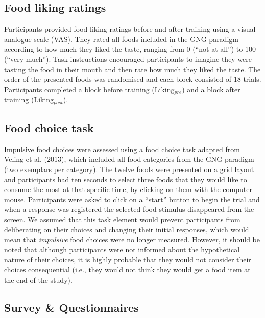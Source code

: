\documentclass[man,floatsintext]{apa6}
\begin{document}
\subsection{Food liking ratings}\label{food_ratings}

\par

Participants provided food liking ratings before and after training
using a visual analogue scale (VAS). They rated all foods included in
the GNG paradigm according to how much they liked the taste, ranging
from 0 (\enquote{not at all}) to 100 (\enquote{very much}). Task
instructions encouraged participants to imagine they were tasting the
food in their mouth and then rate how much they liked the taste. The
order of the presented foods was randomised and each block consisted of
18 trials. Participants completed a block before training
(Liking\(_{pre}\)) and a block after training (Liking\(_{post}\)).

\subsection{Food choice task}\label{food_choice}

Impulsive food choices were assessed using a food choice task adapted
from Veling et al. (2013), which included all food categories from the
GNG paradigm (two exemplars per category). The twelve foods were
presented on a grid layout and participants had ten seconds to select
three foods that they would like to consume the most at that specific
time, by clicking on them with the computer mouse. Participants were
asked to click on a \enquote{start} button to begin the trial and when a
response was registered the selected food stimulus disappeared from the
screen. We assumed that this task element would prevent participants
from deliberating on their choices and changing their initial responses,
which would mean that \emph{impulsive} food choices were no longer
measured. However, it should be noted that although participants were
not informed about the hypothetical nature of their choices, it is
highly probable that they would not consider their choices consequential
(i.e., they would not think they would get a food item at the end of the
study).

\subsection{Survey \& Questionnaires}\label{survey_questionnaires}
\end{document}
